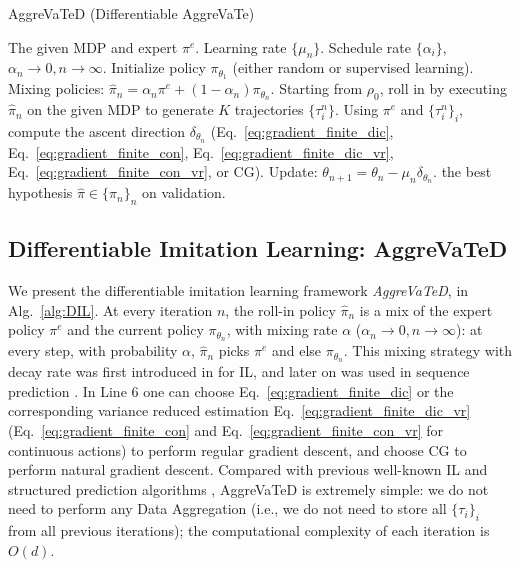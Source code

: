 \documentclass{article}
\begin{document}
\begin{algorithm}[tb]
 \caption{AggreVaTeD (Differentiable AggreVaTe)}
 \begin{algorithmic}[1]
 \label{alg:DIL}
  The given MDP and expert $\pi^e$.  Learning rate $\{\mu_n\}$. Schedule rate $\{\alpha_i\}$, $\alpha_n\to0, n\to\infty$. 
 \STATE Initialize policy $\pi_{\theta_1}$ (either random or supervised learning). 
    \STATE Mixing policies: $\hat{\pi}_n= \alpha_n\pi^e + (1-\alpha_n)\pi_{\theta_n}$.
    \STATE \label{line:rolling_in} Starting from $\rho_0$, roll in by executing $\hat{\pi}_{n}$ on the given MDP to generate $K$ trajectories $\{\tau_i^n\}$.
    \STATE Using $\pi^e$ and $\{\tau_i^n\}_i$, compute the ascent direction $\delta_{\theta_n}$ (Eq.~\ref{eq:gradient_finite_dic}, Eq.~\ref{eq:gradient_finite_con},
    Eq.~\ref{eq:gradient_finite_dic_vr}, Eq.~\ref{eq:gradient_finite_con_vr}, or CG).
    \label{line:gradient_compute}
    \STATE Update: $\theta_{n+1} = \theta_n - \mu_n\delta_{\theta_n}$.
\ENDFOR
  the best hypothesis $\hat{\pi}\in\{\pi_n\}_n$ on validation.
 \end{algorithmic}
\end{algorithm}


\subsection{Differentiable Imitation Learning: AggreVaTeD}
We present the differentiable imitation learning framework \emph{AggreVaTeD}, in Alg.~\ref{alg:DIL}. At every iteration $n$, the roll-in policy $\hat{\pi}_n$ is a mix of the expert policy $\pi^e$ and the current policy $\pi_{\theta_n}$, with mixing rate $\alpha$ ($\alpha_n\to0, n\to\infty$): at every step, with probability $\alpha$, $\hat{\pi}_n$ picks $\pi^e$ and else $\pi_{\theta_n}$. This mixing strategy with decay rate was first introduced in \cite{Ross2011_AISTATS} for IL, and later on was used in sequence prediction \cite{bengio2015scheduled}. In Line 6 %
one can choose Eq.~\ref{eq:gradient_finite_dic} or the corresponding variance reduced estimation Eq.~\ref{eq:gradient_finite_dic_vr} (Eq.~\ref{eq:gradient_finite_con} and Eq.~\ref{eq:gradient_finite_con_vr} for continuous actions) to perform regular gradient descent, and choose CG to perform natural gradient descent. Compared with previous well-known IL and structured prediction algorithms \cite{Ross2011_AISTATS,ross2014reinforcement,chang2015learning}, AggreVaTeD is extremely simple: we do not need to perform any Data Aggregation (i.e., we do not need to store all $\{\tau_i\}_i$ from all previous iterations); the computational complexity of each iteration is $O(d)$. %
\end{document}
